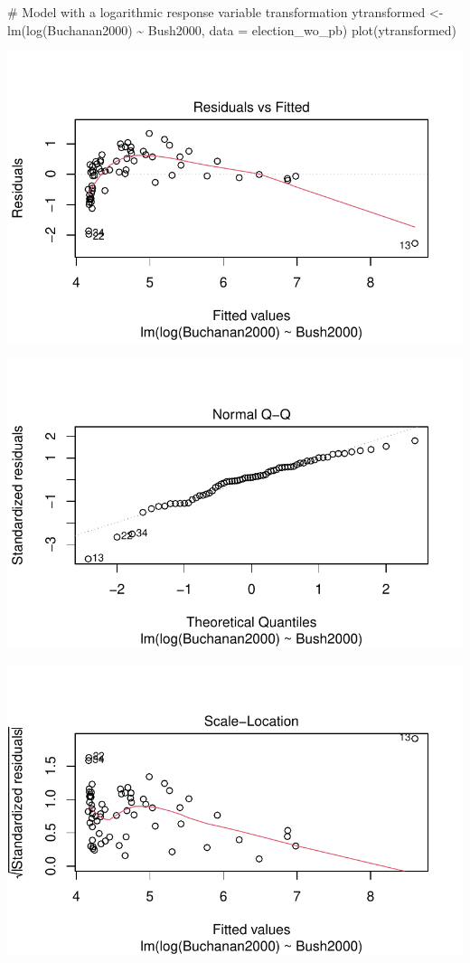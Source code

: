 \documentclass[
  letterpaper,
  DIV=11,
  numbers=noendperiod]{scrartcl}
\newenvironment{Shaded}{\begin{snugshade}}{\end{snugshade}}
\newcommand{\AttributeTok}[1]{\textcolor[rgb]{0.40,0.45,0.13}{#1}}
\newcommand{\CommentTok}[1]{\textcolor[rgb]{0.37,0.37,0.37}{#1}}
\newcommand{\FunctionTok}[1]{\textcolor[rgb]{0.28,0.35,0.67}{#1}}
\newcommand{\NormalTok}[1]{\textcolor[rgb]{0.00,0.23,0.31}{#1}}
\newcommand{\OtherTok}[1]{\textcolor[rgb]{0.00,0.23,0.31}{#1}}
\newcommand{\SpecialCharTok}[1]{\textcolor[rgb]{0.37,0.37,0.37}{#1}}
\begin{document}
\begin{Shaded}
\begin{Highlighting}[]
\CommentTok{\# Model with a logarithmic response variable transformation}
\NormalTok{ytransformed }\OtherTok{\textless{}{-}} \FunctionTok{lm}\NormalTok{(}\FunctionTok{log}\NormalTok{(Buchanan2000) }\SpecialCharTok{\textasciitilde{}}\NormalTok{ Bush2000, }\AttributeTok{data =}\NormalTok{ election\_wo\_pb)}
\FunctionTok{plot}\NormalTok{(ytransformed)}
\end{Highlighting}
\end{Shaded}

\includegraphics{case_study_1_files/figure-pdf/unnamed-chunk-3-11.pdf}

\includegraphics{case_study_1_files/figure-pdf/unnamed-chunk-3-12.pdf}

\includegraphics{case_study_1_files/figure-pdf/unnamed-chunk-3-13.pdf}
\end{document}
